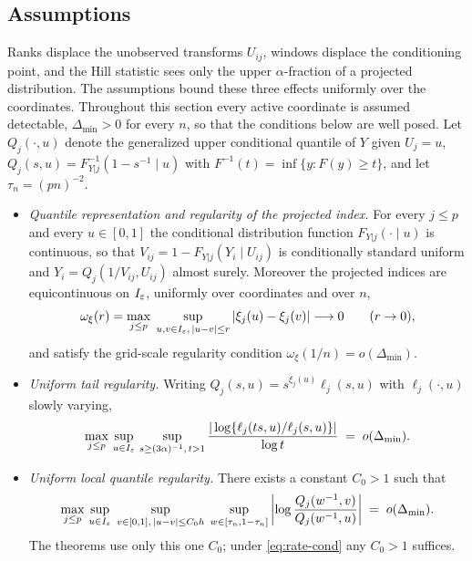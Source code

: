 \subsection{Assumptions}

Ranks displace the unobserved transforms $U_{ij}$, windows displace the
conditioning point, and the Hill statistic sees only the upper
$\alpha$-fraction of a projected distribution. The assumptions bound these
three effects uniformly over the coordinates. Throughout this section
every active coordinate is assumed detectable, $\Delta_{\min}>0$ for
every $n$, so that the conditions below are well posed. Let
$Q_j(\cdot,u)$ denote the generalized upper conditional quantile of $Y$
given $U_j=u$, $Q_j(s,u)=F_{Y|j}^{-1}(1-s^{-1}\mid u)$ with
$F^{-1}(t)=\inf\{y:F(y)\ge t\}$, and let $\tau_n=(pn)^{-2}$.

\begin{itemize}
\item[(E1)] \emph{Quantile representation and regularity of the projected
index.} For every $j\le p$ and every $u\in[0,1]$ the conditional
distribution function $F_{Y|j}(\cdot\mid u)$ is continuous, so that
$V_{ij}=1-F_{Y|j}(Y_i\mid U_{ij})$ is conditionally standard uniform and
$Y_i=Q_j(1/V_{ij},U_{ij})$ almost surely. Moreover the projected indices
are equicontinuous on $I_\varepsilon$, uniformly over coordinates and over $n$,
\[
 \omega_\xi(r)=\max_{j\le p}\;
 \sup_{u,v\in I_\varepsilon,\,|u-v|\le r}|\xi_j(u)-\xi_j(v)|
 \longrightarrow0\qquad(r\to0),
\]
and satisfy the grid-scale regularity condition
$\omega_\xi(1/n)=o(\Delta_{\min})$.
\item[(E2)] \emph{Uniform tail regularity.} Writing
$Q_j(s,u)=s^{\xi_j(u)}\ell_j(s,u)$ with $\ell_j(\cdot,u)$ slowly varying,
\[
 \max_{j\le p}\,\sup_{u\in I_\varepsilon}\,
 \sup_{s\ge(3\alpha)^{-1},\,t>1}
 \frac{|\log\{\ell_j(ts,u)/\ell_j(s,u)\}|}{\log t}
 \;=\;o(\Delta_{\min}).
\]
\item[(E3)] \emph{Uniform local quantile regularity.} There exists a
constant $C_0>1$ such that
\[
 \max_{j\le p}\,
 \sup_{u\in I_\varepsilon}\;
 \sup_{v\in[0,1],\,|u-v|\le C_0h}\;
 \sup_{w\in[\tau_n,1-\tau_n]}
 \left|\log\frac{Q_j(w^{-1},v)}{Q_j(w^{-1},u)}\right|
 \;=\;o(\Delta_{\min}).
\]
The theorems use only this one $C_0$; under \eqref{eq:rate-cond} any
$C_0>1$ suffices.
\end{itemize}



